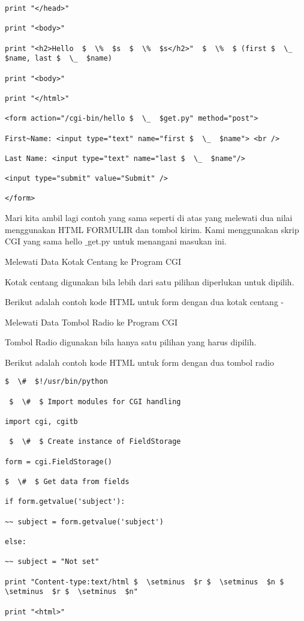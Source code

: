 \begin {enumerate}
\begin {enumerate}
\begin{verbatim}
print "</head>"

print "<body>"

print "<h2>Hello  $  \%  $s  $  \%  $s</h2>"  $  \%  $ (first $  \_  $name, last $  \_  $name)

print "<body>"

print "</html>"

<form action="/cgi-bin/hello $  \_  $get.py" method="post">

First~Name: <input type="text" name="first $  \_  $name"> <br />

Last Name: <input type="text" name="last $  \_  $name"/>

<input type="submit" value="Submit" />

</form>

\end{verbatim}
Mari kita ambil lagi contoh yang sama seperti di atas yang melewati dua nilai menggunakan HTML FORMULIR dan tombol kirim. Kami menggunakan skrip CGI yang sama hello $  \_  $get.py untuk menangani masukan ini.

Melewati Data Kotak Centang ke Program CGI

Kotak centang digunakan bila lebih dari satu pilihan diperlukan untuk dipilih.

Berikut adalah contoh kode HTML untuk form dengan dua kotak centang -

Melewati Data Tombol Radio ke Program CGI

Tombol Radio digunakan bila hanya satu pilihan yang harus dipilih.

Berikut adalah contoh kode HTML untuk form dengan dua tombol radio
\begin{verbatim}
$  \#  $!/usr/bin/python

 $  \#  $ Import modules for CGI handling

import cgi, cgitb

 $  \#  $ Create instance of FieldStorage

form = cgi.FieldStorage()

$  \#  $ Get data from fields

if form.getvalue('subject'):

~~ subject = form.getvalue('subject')

else:

~~ subject = "Not set"

print "Content-type:text/html $  \setminus  $r $  \setminus  $n $  \setminus  $r $  \setminus  $n"

print "<html>"


\end{verbatim}
\end{enumerate}
\end{enumerate}
